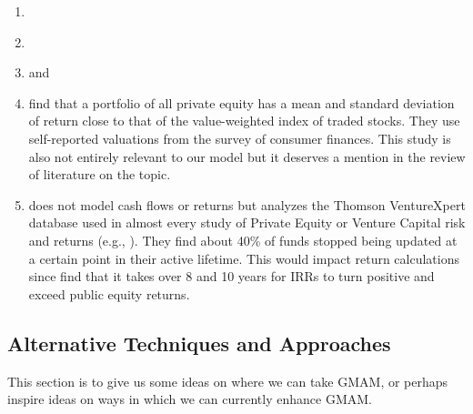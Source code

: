 \documentclass[final,5p,times,twocolumn,authoryear]{elsarticle}
\begin{document}
\begin{enumerate}[resume, label=(\roman*)]
	\item \cite{Driessen2008}
	
	\item \cite{Hwang2005}

	\item \cite{Gottschalg2007} and \cite{Phalippou2008}

	\item \cite{Moskowitz2002} find that a portfolio of all private equity has a mean and standard deviation of return close to that of the value-weighted index of traded stocks. They use self-reported valuations from the survey of consumer finances. This study is also not entirely relevant to our model but it deserves a mention in the review of literature on the topic. 

	\item \cite{Stucke2011} does not model cash flows or returns but analyzes the Thomson VentureXpert database used in almost every study of Private Equity or Venture Capital risk and returns (e.g., \cite{Kaplan2005}). They find about 40\% of funds stopped being updated at a certain point in their active lifetime. This would impact return calculations since \cite{Ljungqvist2002} find that it takes over 8 and 10 years for IRRs to turn positive and exceed public equity returns. 

\end{enumerate}

\subsection{Alternative Techniques and Approaches}

This section is to give us some ideas on where we can take GMAM, or perhaps inspire ideas on ways in which we can currently enhance GMAM.
\end{document}
